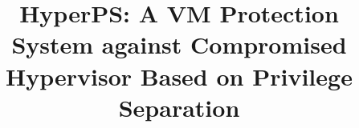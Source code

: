 \documentclass[10pt, numbers, preprint ]{sigplanconf}
\begin{document}
\setlength{\pdfpageheight}{\paperheight}
\setlength{\pdfpagewidth}{\paperwidth}



\titlebanner{}        %
\preprintfooter{}   %

\title{HyperPS: A VM Protection System against Compromised Hypervisor Based on Privilege Separation}
\end{document}
